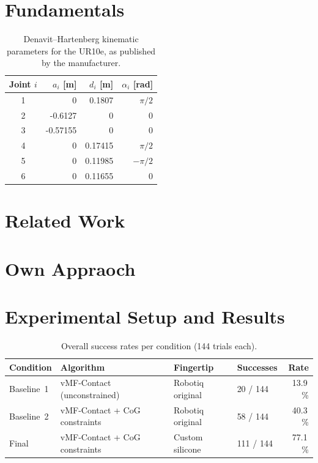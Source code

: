 \documentclass[12pt,a4paper]{report}
\begin{document}
\chapter{Fundamentals}
\begin{table}[htbp]
  \centering
  \caption{Denavit--Hartenberg kinematic parameters for the UR10e, as published by the manufacturer.}
  \label{tab:ur10e-dh-parameters}
  \begin{tabular}{crrr}
    \toprule
    Joint $i$ & $a_i$ [m] & $d_i$ [m] & $\alpha_i$ [rad] \\
    \midrule
    1 & 0        & 0.1807  & $\pi/2$  \\
    2 & -0.6127  & 0       & 0        \\
    3 & -0.57155 & 0       & 0        \\
    4 & 0        & 0.17415 & $\pi/2$  \\
    5 & 0        & 0.11985 & $-\pi/2$ \\
    6 & 0        & 0.11655 & 0        \\
    \bottomrule
  \end{tabular}
\end{table}

\newpage

\chapter{Related Work}

\chapter{Own Appraoch}

\chapter{Experimental Setup and Results}
\begin{table}[htbp]
  \centering
  \caption{Overall success rates per condition (144 trials each).}
  \label{tab:success-rates}
  \begin{tabular}{llllr}
    \toprule
    Condition & Algorithm & Fingertip & Successes & Rate \\
    \midrule
    Baseline~1 & vMF-Contact (unconstrained) & Robotiq original &
      20 / 144 & 13.9\,\% \\
    Baseline~2 & vMF-Contact + CoG constraints & Robotiq original &
      58 / 144 & 40.3\,\% \\
    Final & vMF-Contact + CoG constraints & Custom silicone &
      111 / 144 & 77.1\,\% \\
    \bottomrule
  \end{tabular}
\end{table}
\end{document}
